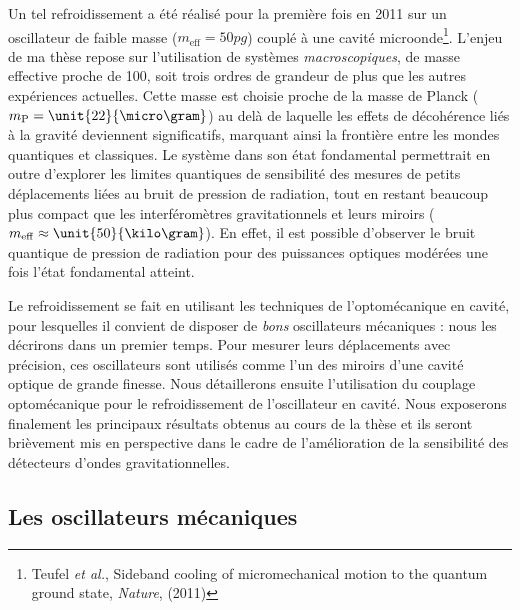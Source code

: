 \documentclass[12pt,a4paper]{article}
\begin{document}
Un tel refroidissement a été réalisé pour la première fois en 2011 sur un oscillateur de faible masse ($m_\mathrm{eff} = \unit{50}{pg}$) couplé à une cavité microonde\footnote{Teufel \textit{et al.}, Sideband cooling of micromechanical motion to the quantum ground state, \textit{Nature}, (2011)}.
L'enjeu de ma thèse repose sur l'utilisation de systèmes \emph{macroscopiques}, de masse effective proche de \unit{100}{\micro\gram}, soit trois ordres de grandeur de plus que les autres expériences actuelles.
Cette masse est choisie proche de la masse de Planck ($m_\mathrm{P}=\unit{22}{\micro\gram}$) au delà de laquelle les effets de décohérence liés à la gravité deviennent significatifs, marquant ainsi la frontière entre les \og mondes \fg{} quantiques et classiques. 
Le système dans son état fondamental permettrait en outre d'explorer les limites quantiques de sensibilité des mesures de petits déplacements liées au bruit de pression de radiation, tout en restant beaucoup plus compact que les interféromètres gravitationnels et leurs miroirs ($m_\mathrm{eff}\approx\unit{50}{\kilo\gram}$).
En effet, il est possible d'observer le bruit quantique de pression de radiation pour des puissances optiques modérées une fois l'état fondamental atteint.

Le refroidissement se fait en utilisant les techniques de l'optomécanique en cavité, pour lesquelles il convient de disposer de \textit{bons} oscillateurs mécaniques : nous les décrirons dans un premier temps.
Pour mesurer leurs déplacements avec précision, ces oscillateurs sont utilisés comme l'un des miroirs d'une cavité optique de grande finesse.
Nous détaillerons ensuite l'utilisation du couplage optomécanique pour le refroidissement de l'oscillateur en cavité.
Nous exposerons finalement les principaux résultats obtenus au cours de la thèse et ils seront brièvement mis en perspective dans le cadre de l'amélioration de la sensibilité des détecteurs d'ondes gravitationnelles.

\subsection{Les oscillateurs mécaniques}
\label{sec:mechanical_oscillators}
\end{document}
